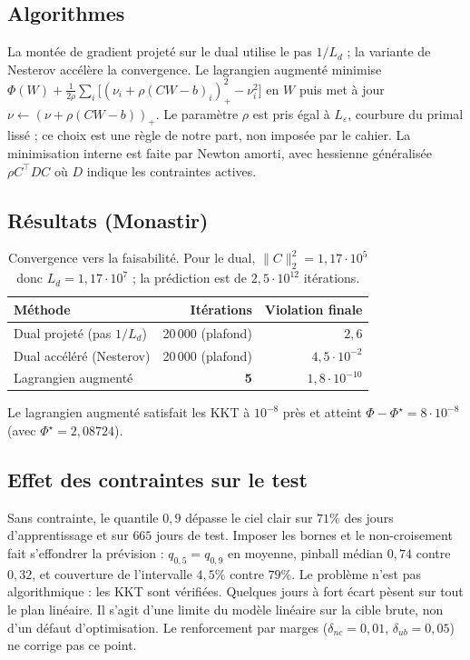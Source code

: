 \documentclass[11pt,a4paper]{article}
\theoremstyle{remark}
\theoremstyle{definition}
\newcommand{\T}{^{\top}}
\begin{document}
\subsection{Algorithmes}
La montée de gradient projeté sur le dual utilise le pas $1/L_d$ ; la variante de Nesterov accélère la convergence. Le lagrangien augmenté
minimise $\Phi(W) + \frac1{2\rho}\sum_i\bigl[(\nu_i + \rho(CW-b)_i)_+^2 - \nu_i^2\bigr]$ en $W$ puis met à jour $\nu \leftarrow (\nu + \rho(CW-b))_+$.
Le paramètre $\rho$ est pris égal à $L_\varepsilon$, courbure du primal lissé ; ce choix est une règle de notre part, non imposée par le cahier.
La minimisation interne est faite par Newton amorti, avec hessienne généralisée $\rho C\T D C$ où $D$ indique les contraintes actives.

\subsection{Résultats (Monastir)}
\begin{table}[h]\centering
\begin{tabular}{lrr}
\toprule
Méthode & Itérations & Violation finale \\
\midrule
Dual projeté (pas $1/L_d$) & 20\,000 (plafond) & $2{,}6$ \\
Dual accéléré (Nesterov) & 20\,000 (plafond) & $4{,}5\cdot10^{-2}$ \\
Lagrangien augmenté & \textbf{5} & $1{,}8\cdot10^{-10}$ \\
\bottomrule
\end{tabular}
\caption{Convergence vers la faisabilité. Pour le dual, $\|C\|_2^2 = 1{,}17\cdot10^5$ donc $L_d = 1{,}17\cdot10^7$ ; la prédiction est de $2{,}5\cdot10^{12}$ itérations.}
\end{table}
Le lagrangien augmenté satisfait les KKT à $10^{-8}$ près et atteint $\Phi - \Phi^\star = 8\cdot10^{-8}$ (avec $\Phi^\star = 2{,}08724$).

\subsection{Effet des contraintes sur le test}
Sans contrainte, le quantile $0{,}9$ dépasse le ciel clair sur $71\%$ des jours d'apprentissage et sur $665$ jours de test.
Imposer les bornes et le non-croisement fait s'effondrer la prévision : $q_{0,5} = q_{0,9}$ en moyenne, pinball médian $0{,}74$ contre $0{,}32$,
et couverture de l'intervalle $4{,}5\%$ contre $79\%$. Le problème n'est pas algorithmique : les KKT sont vérifiées. Quelques jours à fort écart pèsent sur tout le plan linéaire.
Il s'agit d'une limite du modèle linéaire sur la cible brute, non d'un défaut d'optimisation. Le renforcement par marges
($\delta_{nc} = 0{,}01$, $\delta_{ub} = 0{,}05$) ne corrige pas ce point.
\end{document}
